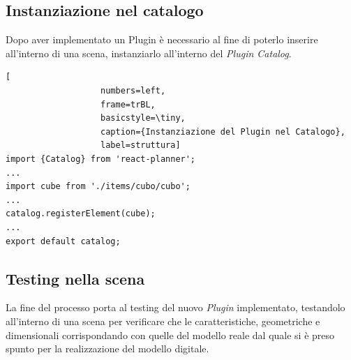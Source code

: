 \subsection{Instanziazione nel catalogo}
Dopo aver implementato un Plugin è necessario al fine di poterlo inserire all'interno di una scena, instanziarlo
all'interno del \emph{Plugin Catalog}.\\
\begin{lstlisting}[
                   numbers=left,
                   frame=trBL,
                   basicstyle=\tiny,
                   caption={Instanziazione del Plugin nel Catalogo},
                   label=struttura]
import {Catalog} from 'react-planner';
...
import cube from './items/cubo/cubo';
...
catalog.registerElement(cube);
...
export default catalog;
\end{lstlisting}

\subsection{Testing nella scena}
La fine del processo porta al testing del nuovo \emph{Plugin} implementato, testandolo all'interno
di una scena per verificare che le caratteristiche, geometriche e dimensionali corrispondando con quelle
del modello reale dal quale si è preso spunto per la realizzazione del modello digitale.
